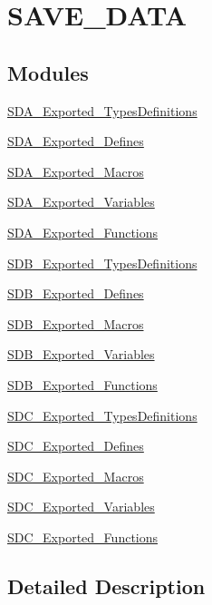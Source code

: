 \hypertarget{group___s_a_v_e___d_a_t_a}{}\section{S\+A\+V\+E\+\_\+\+D\+A\+TA}
\label{group___s_a_v_e___d_a_t_a}
\subsection*{Modules}
\begin{DoxyCompactItemize}
\item 
\mbox{\hyperlink{group___s_d_a___exported___types_definitions}{S\+D\+A\+\_\+\+Exported\+\_\+\+Types\+Definitions}}
\item 
\mbox{\hyperlink{group___s_d_a___exported___defines}{S\+D\+A\+\_\+\+Exported\+\_\+\+Defines}}
\item 
\mbox{\hyperlink{group___s_d_a___exported___macros}{S\+D\+A\+\_\+\+Exported\+\_\+\+Macros}}
\item 
\mbox{\hyperlink{group___s_d_a___exported___variables}{S\+D\+A\+\_\+\+Exported\+\_\+\+Variables}}
\item 
\mbox{\hyperlink{group___s_d_a___exported___functions}{S\+D\+A\+\_\+\+Exported\+\_\+\+Functions}}
\item 
\mbox{\hyperlink{group___s_d_b___exported___types_definitions}{S\+D\+B\+\_\+\+Exported\+\_\+\+Types\+Definitions}}
\item 
\mbox{\hyperlink{group___s_d_b___exported___defines}{S\+D\+B\+\_\+\+Exported\+\_\+\+Defines}}
\item 
\mbox{\hyperlink{group___s_d_b___exported___macros}{S\+D\+B\+\_\+\+Exported\+\_\+\+Macros}}
\item 
\mbox{\hyperlink{group___s_d_b___exported___variables}{S\+D\+B\+\_\+\+Exported\+\_\+\+Variables}}
\item 
\mbox{\hyperlink{group___s_d_b___exported___functions}{S\+D\+B\+\_\+\+Exported\+\_\+\+Functions}}
\item 
\mbox{\hyperlink{group___s_d_c___exported___types_definitions}{S\+D\+C\+\_\+\+Exported\+\_\+\+Types\+Definitions}}
\item 
\mbox{\hyperlink{group___s_d_c___exported___defines}{S\+D\+C\+\_\+\+Exported\+\_\+\+Defines}}
\item 
\mbox{\hyperlink{group___s_d_c___exported___macros}{S\+D\+C\+\_\+\+Exported\+\_\+\+Macros}}
\item 
\mbox{\hyperlink{group___s_d_c___exported___variables}{S\+D\+C\+\_\+\+Exported\+\_\+\+Variables}}
\item 
\mbox{\hyperlink{group___s_d_c___exported___functions}{S\+D\+C\+\_\+\+Exported\+\_\+\+Functions}}
\end{DoxyCompactItemize}


\subsection{Detailed Description}
